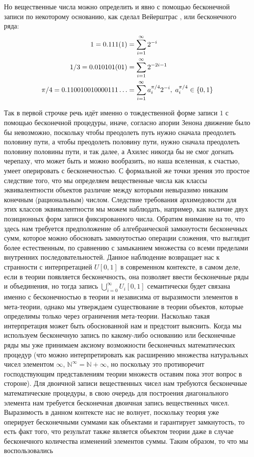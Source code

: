 \documentclass[12pt]{article}
\begin{document}
Но вещественные числа можно определить и явно с помощью бесконечной записи по некоторому основанию, как сделал Вейерштрас \cite{decimal}, или бесконечного ряда:
\begin{align}
\begin{split}
1 = 0.111(1) &= \sum_{i=1}^{\infty} 2^{-i}\\
1/3 = 0.010101(01) &= \sum_{i=1}^{\infty} 2^{-2i-1}\\
\pi/4 = 0.110010010000111\dots &= \sum_{i=1}^{\infty} a_i^{\pi/4}2^{-i},\thickspace a_i^{\pi/4} \in \{0, 1\}
\end{split}
\end{align}

Так в первой строчке речь идёт именно о тождественной форме записи $1$ с помощью бесконечной процедуры, иначе, согласно апории Зенона движение было бы невозможно, поскольку чтобы преодолеть путь нужно сначала преодолеть половину пути, а чтобы преодолеть половину пути, нужно сначала преодолеть половину половины пути, и так далее, а Ахилес никогда бы не смог догнать черепаху, что может быть и можно вообразить, но наша вселенная, к счастью, умеет оперировать с бесконечностью. С формальной же точки зрения это простое следствие того, что мы определяем вещественные числа как классы эквивалентности объектов различие между которыми невыразимо никаким конечным (рациональным) числом. Следствие требования архимедовости для этих классов эквивалентности мы можем наблюдать, например, как наличие двух позиционных форм записи фиксированного числа. Обратим внимание на то, что здесь нам требуется предположение об алгебраической замкнутости бесконечных сумм, которое можно обосновать замкнутостью операции сложения, что выглядит более естественным, по сравнению с замыканием множества со всеми пределами внутренних последовательностей. Данное наблюдение возвращает нас к странности с интерпретацией $U[0, 1]$ в современном контексте, в самом деле, если в теории появляется бесконечность, она позволяет ввести бесконечные ряды и объединения, но тогда запись $\bigcup\limits^{\infty}_{i = 0} U_i[0, 1]$ семантически будет связана именно с бесконечностью в теории и независима от выразимости элементов в мета-теории, однако мы утверждаем существование в теории объектов, которые определимы только через ограничения мета-теории. Насколько такая интерпретация может быть обоснованной нам и предстоит выяснить. Когда мы используем бесконечную запись по какому-либо основанию или бесконечные ряды мы уже принимаем аксиому возможности бесконечных математических процедур (что можно интерпретировать как расширению множества натуральных чисел элементом $\infty$, $\mathbb{N}^{\infty} = \mathbb{N} + \infty$, но поскольку это противоречит господствующим представлениям теории множеств оставим пока этот вопрос в стороне). Для двоичной записи вещественных чисел нам требуются бесконечные математические процедуры, в свою очередь для построения диагонального элемента нам требуется бесконечная двоичная запись вещественных чисел. Выразимость в данном контексте нас не волнует, поскольку теория уже оперирует бесконечными суммами как объектами и гарантирует замкнутость, то есть факт того, что результат также является объектом теории даже в случае бесконечного количества изменений элементов суммы. Таким образом, то что мы воспользовались 
\end{document}
